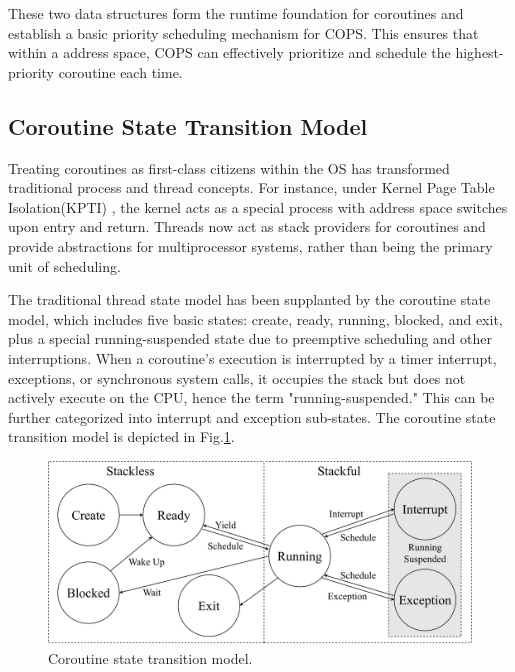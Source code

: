 \documentclass[conference]{IEEEtran}
\begin{document}
These two data structures form the runtime foundation for coroutines and establish a basic priority scheduling mechanism for COPS. This ensures that within a address space, COPS can effectively prioritize and schedule the highest-priority coroutine each time.

\subsection{Coroutine State Transition Model}
\label{section: state-transition}

Treating coroutines as first-class citizens within the OS has transformed traditional process and thread concepts. For instance, under Kernel Page Table Isolation(KPTI) \cite{kpti}, the kernel acts as a special process with address space switches upon entry and return. Threads now act as stack providers for coroutines and provide abstractions for multiprocessor systems, rather than being the primary unit of scheduling.

The traditional thread state model has been supplanted by the coroutine state model, which includes five basic states: create, ready, running, blocked, and exit, plus a special running-suspended state due to preemptive scheduling and other interruptions. When a coroutine's execution is interrupted by a timer interrupt, exceptions, or synchronous system calls, it occupies the stack but does not actively execute on the CPU, hence the term "running-suspended." This can be further categorized into interrupt and exception sub-states. The coroutine state transition model is depicted in Fig.\ref{fig:state}.

\begin{figure}[tbp]
  \centering
  \includegraphics[width=\linewidth]{assets/cstate.pdf}
  \caption{Coroutine state transition model.}
  \label{fig:state}
  \vspace{-1em}
\end{figure}
\end{document}
